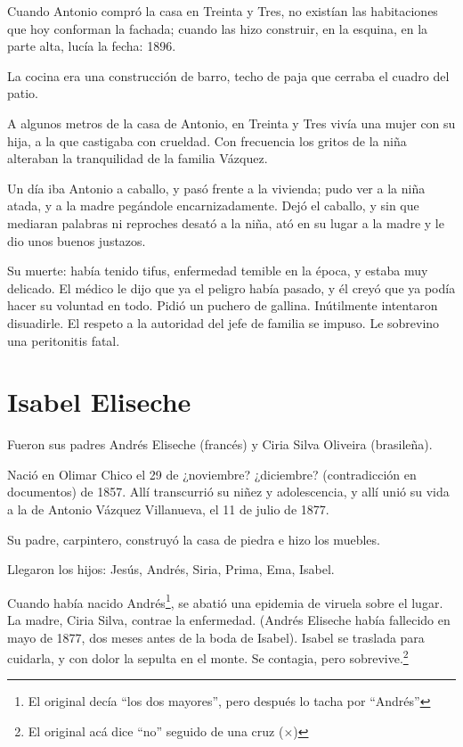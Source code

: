 \documentclass[a4paper]{article}
\begin{document}
\bigbreak{}

Cuando Antonio compró la casa en Treinta y Tres, no existían las habitaciones que hoy conforman la fachada; cuando las hizo construir, en la esquina, en la parte alta, lucía la fecha: 1896.

La cocina era una construcción de barro, techo de paja que cerraba el cuadro del patio.

\bigbreak{}

A algunos metros de la casa de Antonio, en Treinta y Tres vivía una mujer con su hija, a la que castigaba con crueldad. Con frecuencia los gritos de la niña alteraban la tranquilidad de la familia Vázquez.

Un día iba Antonio a caballo, y pasó frente a la vivienda; pudo ver a la niña atada, y a la madre pegándole encarnizadamente. Dejó el caballo, y sin que mediaran palabras ni reproches desató a la niña, ató en su lugar a la madre y le dio unos buenos justazos.

\bigbreak{}

Su muerte: había tenido tifus, enfermedad temible en la época, y estaba muy delicado. El médico le dijo que ya el peligro había pasado, y él creyó que ya podía hacer su voluntad en todo. Pidió un puchero de gallina. Inútilmente intentaron disuadirle. El respeto a la autoridad del jefe de familia se impuso. Le sobrevino una peritonitis fatal.

\section{Isabel Eliseche}

Fueron sus padres Andrés Eliseche (francés) y Ciria Silva Oliveira (brasileña).

Nació en Olimar Chico el 29 de ¿noviembre? ¿diciembre? (contradicción en documentos) de 1857. Allí transcurrió su niñez y adolescencia, y allí unió su vida a la de Antonio Vázquez Villanueva, el 11 de julio de 1877.

Su padre, carpintero, construyó la casa de piedra e hizo los muebles.

Llegaron los hijos: Jesús, Andrés, Siria, Prima, Ema, Isabel.

Cuando había nacido Andrés\footnote{El original decía ``los dos mayores'', pero después lo tacha por ``Andrés''}, se abatió una epidemia de viruela sobre el lugar. La madre, Ciria Silva, contrae la enfermedad. (Andrés Eliseche había fallecido en mayo de 1877, dos meses antes de la boda de Isabel). Isabel se traslada para cuidarla, y con dolor la sepulta en el monte. Se contagia, pero sobrevive.\footnote{El original acá dice ``no'' seguido de una cruz ($\times$)}
\end{document}
